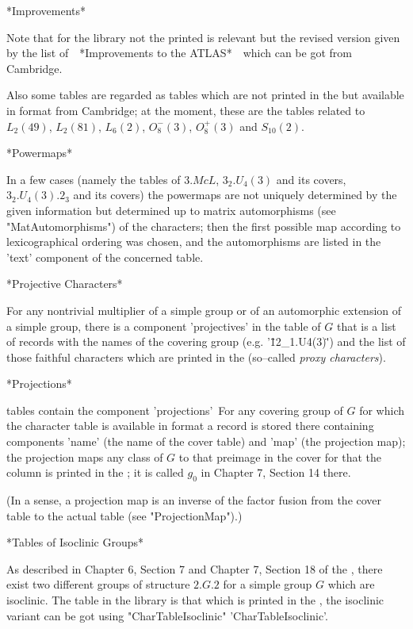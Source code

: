 *Improvements*

Note that for the {\GAP} library not the printed {\ATLAS} is relevant but
the revised version given by the list of\ \  *Improvements to the ATLAS*\
\ which can be got from Cambridge.

Also some tables are regarded as {\ATLAS} tables which are not printed in
the {\ATLAS} but available  in  {\ATLAS} format  from Cambridge; at   the
moment, these  are the tables  related to $L_2(49)$, $L_2(81)$, $L_6(2)$,
$O_8^-(3)$, $O_8^+(3)$ and $S_{10}(2)$.

*Powermaps*

In a few   cases (namely  the  tables of  $3.McL$,  $3_2.U_4(3)$  and its
covers,  $3_2.U_4(3).2_3$ and its  covers) the powermaps are not uniquely
determined by   the   given  information but  determined   up  to  matrix
automorphisms (see "MatAutomorphisms") of  the characters; then the first
possible map according  to  lexicographical ordering was chosen,  and the
automorphisms are listed in the 'text' component of the concerned table.

*Projective Characters*

For  any nontrivial  multiplier of a  simple group  or  of an automorphic
extension of a  simple group, there is a  component  'projectives' in the
table of  $G$ that is a  list of records with  the  names of the covering
group (e.g.  '\"12\_1.U4(3)\"') and the list of those faithful characters
which are printed in the \ATLAS (so--called {\it proxy characters}).

*Projections*

{\ATLAS} tables contain  the component 'projections'\:\ For any  covering
group  of $G$  for which the  character  table is  available  in {\ATLAS}
format a record is stored there containing components 'name' (the name of
the cover table) and 'map' (the  projection map); the projection maps any
class of $G$ to that preimage in the cover for that the column is printed
in the \ATLAS; it is called $g_0$ in Chapter 7, Section 14 there.

(In a sense, a projection map is an inverse of the factor fusion from the
cover table to the actual table (see "ProjectionMap").)

*Tables of Isoclinic Groups*

As described in  Chapter 6, Section  7 and  Chapter 7, Section  18 of the
\ATLAS, there  exist two different   groups of  structure  $2.G.2$ for  a
simple group $G$  which are isoclinic.  The {\ATLAS} table in the library
is that which is printed in the \ATLAS,  the isoclinic variant can be got
using "CharTableIsoclinic" 'CharTableIsoclinic'.

